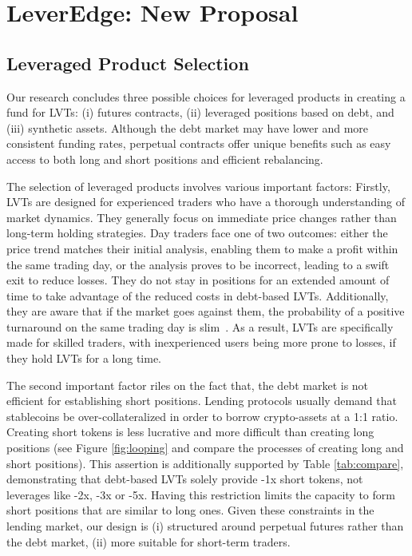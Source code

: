 
\section{LeverEdge: New Proposal}\label{sec:proposal}
\subsection{Leveraged Product Selection}\label{subsec:selection}
Our research concludes three possible choices for leveraged products in creating a fund for LVTs: (i) futures contracts, (ii) leveraged positions based on debt, and (iii) synthetic assets. Although the debt market may have lower and more consistent funding rates, perpetual contracts offer unique benefits such as easy access to both long and short positions and efficient rebalancing.

The selection of leveraged products involves various important factors: Firstly, LVTs are designed for experienced traders who have a thorough understanding of market dynamics. They generally focus on immediate price changes rather than long-term holding strategies. Day traders face one of two outcomes: either the price trend matches their initial analysis, enabling them to make a profit within the same trading day, or the analysis proves to be incorrect, leading to a swift exit to reduce losses. They do not stay in positions for an extended amount of time to take advantage of the reduced costs in debt-based LVTs. Additionally, they are aware that if the market goes against them, the probability of a positive turnaround on the same trading day is slim~\cite{fung2000intraday}. As a result, LVTs are specifically made for skilled traders, with inexperienced users being more prone to losses, if they hold LVTs for a long time. 

The second important factor riles on the fact that, the debt market is not efficient for establishing short positions. Lending protocols usually demand that stablecoins be over-collateralized in order to borrow crypto-assets at a 1:1 ratio. Creating short tokens is less lucrative and more difficult than creating long positions (see Figure \ref{fig:looping} and compare the processes of creating long and short positions). This assertion is additionally supported by Table \ref{tab:compare}, demonstrating that debt-based LVTs solely provide -1x short tokens, not leverages like -2x, -3x or -5x. Having this restriction limits the capacity to form short positions that are similar to long ones. Given these constraints in the lending market, our design is (i) structured around perpetual futures rather than the debt market, (ii) more suitable for short-term traders.


